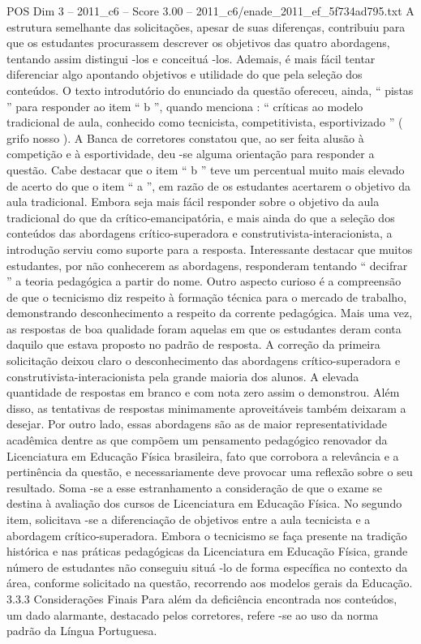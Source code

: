 \begin{textsample}{POS Dim 3 – 2011\_c6 – Score 3.00 – 2011\_c6/enade\_2011\_ef\_5f734ad795.txt}
A estrutura semelhante das solicitações, apesar de suas diferenças, contribuiu para que os estudantes procurassem descrever os objetivos das quatro abordagens, tentando assim distingui -los e conceituá -los.
Ademais, é mais fácil tentar diferenciar algo apontando objetivos e utilidade do que pela seleção dos conteúdos.
O texto introdutório do enunciado da questão ofereceu, ainda, “ pistas ” para responder ao item “ b ”, quando menciona : “ críticas ao modelo tradicional de aula, conhecido como tecnicista, competitivista, esportivizado ” ( grifo nosso ).
A Banca de corretores constatou que, ao ser feita alusão à competição e à esportividade, deu -se alguma orientação para responder a questão.
Cabe destacar que o item “ b ” teve um percentual muito mais elevado de acerto do que o item “ a ”, em razão de os estudantes acertarem o objetivo da aula tradicional.
Embora seja mais fácil responder sobre o objetivo da aula tradicional do que da crítico-emancipatória, e mais ainda do que a seleção dos conteúdos das abordagens crítico-superadora e construtivista-interacionista, a introdução serviu como suporte para a resposta.
Interessante destacar que muitos estudantes, por não conhecerem as abordagens, responderam tentando “ decifrar ” a teoria pedagógica a partir do nome.
Outro aspecto curioso é a compreensão de que o tecnicismo diz respeito à formação técnica para o mercado de trabalho, demonstrando desconhecimento a respeito da corrente pedagógica.
Mais uma vez, as respostas de boa qualidade foram aquelas em que os estudantes deram conta daquilo que estava proposto no padrão de resposta.
A correção da primeira solicitação deixou claro o desconhecimento das abordagens crítico-superadora e construtivista-interacionista pela grande maioria dos alunos.
A elevada quantidade de respostas em branco e com nota zero assim o demonstrou.
Além disso, as tentativas de respostas minimamente aproveitáveis também deixaram a desejar.
Por outro lado, essas abordagens são as de maior representatividade acadêmica dentre as que compõem um pensamento pedagógico renovador da Licenciatura em Educação Física brasileira, fato que corrobora a relevância e a pertinência da questão, e necessariamente deve provocar uma reflexão sobre o seu resultado.
Soma -se a esse estranhamento a consideração de que o exame se destina à avaliação dos cursos de Licenciatura em Educação Física.
No segundo item, solicitava -se a diferenciação de objetivos entre a aula tecnicista e a abordagem crítico-superadora.
Embora o tecnicismo se faça presente na tradição histórica e nas práticas pedagógicas da Licenciatura em Educação Física, grande número de estudantes não conseguiu situá -lo de forma específica no contexto da área, conforme solicitado na questão, recorrendo aos modelos gerais da Educação. 3.3.3 Considerações Finais Para além da deficiência encontrada nos conteúdos, um dado alarmante, destacado pelos corretores, refere -se ao uso da norma padrão da Língua Portuguesa.

\end{textsample}
